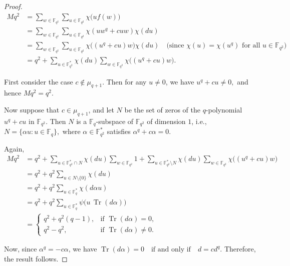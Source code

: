 \documentclass[12pt]{amsart}
\theoremstyle{definition}
\theoremstyle{remark}
\numberwithin{equation}{section}
\begin{document}
\begin{proof}
\begin{align*}
Mq^2
&= \sum_{w \in \mathbb{F}_{q^2}} \sum_{u \in \mathbb{F}_{q^2}} \chi\big(u f(w)\big) \\
&= \sum_{w \in \mathbb{F}_{q^2}} \sum_{u \in \mathbb{F}_{q^2}} \chi(uw^q + cuw)\chi(du) \\
&= \sum_{w \in \mathbb{F}_{q^2}} \sum_{u \in \mathbb{F}_{q^2}} \chi\big((u^q+cu)w\big)\chi(du) 
\quad \text{(since $\chi(u)=\chi(u^q)$ for all $u \in \mathbb{F}_{q^2}$)} \\
&= q^2 + \sum_{u \in \mathbb{F}_{q^2}^{*}} \chi(du)\sum_{w \in \mathbb{F}_{q^2}} \chi\big((u^q+cu)w\big).
\end{align*}

First consider the case $c \notin \mu_{q+1}$. Then for any $u \neq 0$, we have
$u^q+cu \neq 0,$
and hence $Mq^2=q^2.$

Now suppose that $c \in \mu_{q+1}$, and let $N$ be the set of zeros of the $q$-polynomial $u^q+cu$ in $\mathbb{F}_{q^2}$. Then $N$ is a $\mathbb{F}_{q}$-subspace of $\mathbb{F}_{q^2}$ of dimension $1$, i.e.,
$N=\{\alpha u : u \in \mathbb{F}_q\},
$ where $\alpha \in \mathbb{F}_{q^2}^{*}$ satisfies
$ \alpha^q+c\alpha=0.$

Again,
\begin{align*}
Mq^2
&= q^2 + \sum_{u \in \mathbb{F}_{q^2}^{*}\cap N} \chi(du)\sum_{w \in \mathbb{F}_{q^2}} 1
   + \sum_{u \in \mathbb{F}_{q^2}^{*}\setminus N} \chi(du)\sum_{w \in \mathbb{F}_{q^2}} \chi\big((u^q+cu)w\big) \\
&= q^2 + q^2 \sum_{u \in N\setminus\{0\}} \chi(du) \\
&= q^2 + q^2 \sum_{u \in \mathbb{F}_q^{*}} \chi(d\alpha u) \\
&= q^2 + q^2 \sum_{u \in \mathbb{F}_q^{*}} \psi\big(u\,\operatorname{Tr}(d\alpha)\big) \\
&=
\begin{cases}
q^2+q^2(q-1), & \text{if } \operatorname{Tr}(d\alpha)=0,\\[1mm]
q^2-q^2, & \text{if } \operatorname{Tr}(d\alpha)\neq 0.
\end{cases}
\end{align*}

Now, since $\alpha^q=-c\alpha$, we have $\operatorname{Tr}(d\alpha)=0
\quad \text{if and only if} \quad
d=cd^q.$
Therefore, the result follows.
\end{proof}
\end{document}
